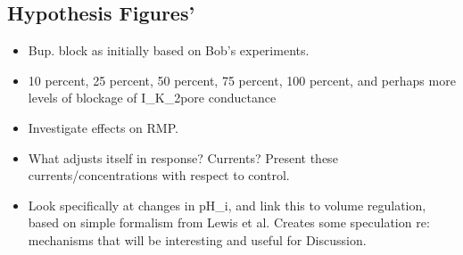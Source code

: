 \subsection{Hypothesis Figures'}
\begin{itemize}
\item{Bup. block as initially based on Bob's experiments.}
\item{10 percent, 25 percent, 50 percent, 75 percent, 100 percent, and perhaps more levels of blockage of I_K_2pore conductance}
\item{Investigate effects on RMP.}
\item{What adjusts itself in response? Currents? Present these currents/concentrations with respect to control.}
\item{Look specifically at changes in pH_i, and link this to volume regulation, based on simple formalism from Lewis et al. Creates some speculation re: mechanisms that will be interesting and useful for Discussion.} 
\end{itemize}

